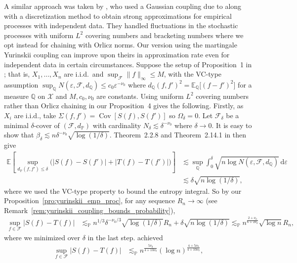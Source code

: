 \documentclass[11pt,lof]{puthesis}
\renewcommand{\P}{\ensuremath{\mathbb{P}}}
\newcommand{\E}{\ensuremath{\mathbb{E}}}
\newcommand{\Q}{\ensuremath{\mathbb{Q}}}
\newcommand{\cF}{\ensuremath{\mathcal{F}}}
\newcommand{\cX}{\ensuremath{\mathcal{X}}}
\DeclareMathOperator{\Cov}{Cov}
\newcommand{\diff}[1]{\,\mathrm{d}#1}
\theoremstyle{break}
\theoremstyle{proof}
\begin{document}
A similar approach was taken by \citet{berthet2006revisiting}, who used a
Gaussian coupling due to \citet{zaitsev1987estimates,zaitsev1987gaussian} along
with a discretization method to obtain strong approximations for empirical
processes with independent data. They handled fluctuations in the stochastic
processes with uniform $L^2$ covering numbers and bracketing numbers where we
opt instead for chaining with Orlicz norms. Our version using the martingale
Yurinskii coupling can improve upon theirs in approximation rate even for
independent data in certain circumstances. Suppose the setup of
Proposition~1 in \citet{berthet2006revisiting}; that is, $X_1, \ldots, X_n$ are
i.i.d.\ and $\sup_{\cF} \|f\|_\infty \leq M$, with the VC-type assumption
$\sup_\Q N(\varepsilon, \cF, d_\Q) \leq c_0 \varepsilon^{-\nu_0}$ where
$d_\Q(f,f')^2 = \E_\Q\big[(f-f')^2\big]$ for a measure $\Q$ on $\cX$ and
$M, c_0, \nu_0$ are constants. Using uniform $L^2$ covering numbers
rather than Orlicz chaining in our Proposition~4 gives the following.
Firstly, as $X_i$ are i.i.d., take $\Sigma(f, f') = \Cov[S(f), S(f')]$ so
$\Omega_\delta = 0$. Let $\cF_\delta$ be a minimal $\delta$-cover of
$(\cF, d_\P)$ with cardinality $N_\delta \lesssim \delta^{-\nu_0}$ where
$\delta \to 0$. It is easy to show that
$\beta_\delta \lesssim n \delta^{-\nu_0} \sqrt{\log(1/\delta)}$.
Theorem~2.2.8 and Theorem~2.14.1 in \citet{van1996weak} then give
%
\begin{align*}
\E\left[
\sup_{d_\P(f,f') \leq \delta}
\Big(
|S(f) - S(f')|
+ |T(f) - T(f')|
\Big)
\right]
&\lesssim
\sup_\Q
\int_0^\delta
\sqrt{n \log N(\varepsilon, \cF, d_\Q)}
\diff{\varepsilon} \\
&\lesssim
\delta \sqrt{n\log(1/\delta)},
\end{align*}
%
where we used the VC-type property to bound the entropy integral.
So by our Proposition~\ref{pro:yurinskii_emp_proc},
for any sequence $R_n \to \infty$
(see Remark~\ref{rem:yurinskii_coupling_bounds_probability}),
%
\begin{align*}
\sup_{f \in \cF}
\big| S(f) - T(f) \big|
&\lesssim_\P
n^{1/3} \delta^{-\nu_0/3}
\sqrt{\log(1/\delta)} R_n
+ \delta \sqrt{n\log(1/\delta)}
\lesssim_\P
n^{\frac{2+\nu_0}{6+2\nu_0}}
\sqrt{\log n} R_n,
\end{align*}
%
where we minimized over $\delta$ in the last step.
\citet[Proposition~1]{berthet2006revisiting} achieved
%
\begin{align*}
\sup_{f \in \cF}
\big| S(f) - T(f) \big|
&\lesssim_\P
n^{\frac{5\nu_0}{4+10\nu_0}}
(\log n)^{\frac{4+5\nu_0}{4+10\nu_0}},
\end{align*}
\end{document}
